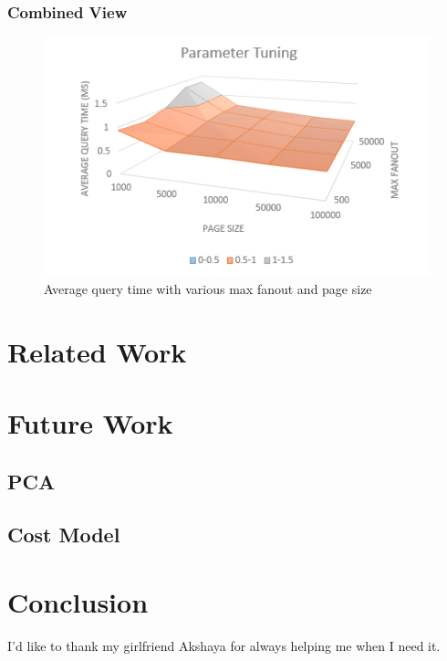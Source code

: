 \documentclass[sigconf,10pt]{acmart}
\begin{document}
\subsubsection{Combined View}

\begin{figure}
  \includegraphics[scale=0.6]{../figures/parameter/avg-qtime-3D}
  \caption{Average query time with various max fanout and page size}
  \label{combined-view}
\end{figure}

\section{Related Work}

\section{Future Work}

\subsection{PCA}

\subsection{Cost Model}

\section{Conclusion}

\begin{acks}
I'd like to thank my girlfriend Akshaya for always helping me when I need it.
\end{acks}



\end{document}
